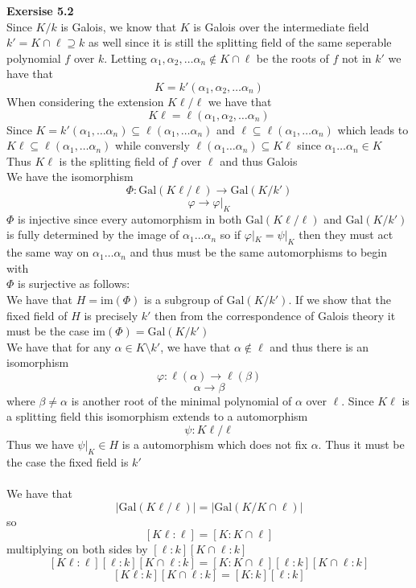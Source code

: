 \documentclass[12pt]{article}
\newenvironment{ques}[1]{\textbf{Exersise #1}\vspace{1 mm}\\ }{\bigskip}
\theoremstyle{definition}
\renewcommand{\a}{\alpha}
\renewcommand{\b}{\beta}
\newcommand{\Gal}{\text{Gal}}
\newcommand{\im}{\text{im}}
\begin{document}
\begin{ques}{5.2}
	Since $K/k$ is Galois, we know that $K$ is Galois over the intermediate field
	$k' =  K \cap \ell \supseteq k$ as well since it is still the splitting
	field of the same seperable polynomial $f$ over $k$. 
	Letting $\a_1, \a_2, \dots \a_n \notin K \cap \ell$ be the roots of $f$ not
	in $k'$ we have that\\
	$$K = k'(\a_1, \a_2, \dots \a_n)$$
	When considering the extension $K\ell / \ell$ we have that
	$$K\ell = \ell(\a_1, \a_2, \dots \a_n)$$
	Since $K = k'(\a_1, \dots \a_n) \subseteq \ell(\a_1, \dots \a_n)$ and $\ell
	\subseteq \ell(\a_1, \dots \a_n)$ which leads to $K\ell \subseteq
	\ell(\a_1, \dots \a_n)$ while conversly $\ell(\a_1 \dots \a_n)
	\subseteq K\ell$ since $\a_1 \dots \a_n \in K$\\
	Thus $K\ell$ is the splitting field of $f$ over $\ell$ and thus Galois\\
	We have the isomorphism
	$$\Phi : \Gal(K\ell/\ell) \to \Gal(K/k')$$
	$$\varphi \to \varphi|_{K}$$
	$\Phi$ is injective since every automorphism in both $\Gal(K\ell/\ell)$ and
	$\Gal(K/k')$ is fully determined by the image of $\a_1 \dots \a_n$ so if
	$\varphi|_K = \psi|_K$ then they must act the same way on $\a_1 \dots \a_n$
	and thus must be the same automorphisms to begin with\\
	$\Phi$ is surjective as follows:\\
	We have that $H = \im(\Phi)$ is a subgroup of $\Gal(K/k')$. If we show that
	the fixed field of $H$ is precisely $k'$ then from the correspondence of
	Galois theory it must be the case $\im(\Phi) = \Gal(K/k')$\\
	We have that for any $\a \in K \setminus k'$, we have that $\a \notin \ell$
	and thus there is an isomorphism
	$$\varphi : \ell(\a) \to \ell(\b)$$
	$$\a \to \b$$
	where $\b \neq \a$ is another root of the minimal polynomial of $\a$ over
	$\ell$. Since $K\ell$ is a splitting field this isomorphism extends to a
	automorphism
	$$\psi : K\ell/\ell$$
	Thus we have $\psi|_K \in H$ is a automorphism which does not fix $\a$.
	Thus it must be the case the fixed field is $k'$\\
	\\
	We have that 
	$$|\Gal(K\ell/\ell)| = |\Gal(K/K\cap \ell)|$$
	so
	$$[K\ell:\ell] = [K:K\cap \ell]$$
	multiplying on both sides by $[\ell:k][K \cap \ell:k]$
	$$[K\ell:\ell][\ell:k][K \cap \ell:k] = [K:K\cap \ell][\ell:k][K \cap \ell:k]$$
	$$[K\ell:k][K \cap \ell:k] = [K:k][\ell:k]$$

\end{ques}
\end{document}

